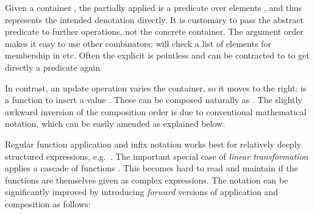 \begin{isabellebody}
\begin{isamarkuptext}
  Given a container , the partially applied  is a predicate over elements , and
  thus represents the intended denotation directly.  It is customary
  to pass the abstract predicate to further operations, not the
  concrete container.  The argument order makes it easy to use other
  combinators:  will check a list of
  elements for membership in  etc. Often the explicit
   is pointless and can be contracted to  to get directly a predicate again.

  In contrast, an update operation varies the container, so it moves
  to the right:  is a function  to
  insert a value .  These can be composed naturally as
  .  The slightly awkward
  inversion of the composition order is due to conventional
  mathematical notation, which can be easily amended as explained
  below.%
\end{isamarkuptext}%
\isamarkuptrue%
%
\isamarkuptrue%
%
\begin{isamarkuptext}%
Regular function application and infix notation works best for
  relatively deeply structured expressions, e.g.\ .  The important special case of \emph{linear transformation}
  applies a cascade of functions .  This
  becomes hard to read and maintain if the functions are themselves
  given as complex expressions.  The notation can be significantly
  improved by introducing \emph{forward} versions of application and
  composition as follows:


\end{isamarkuptext}
\end{isabellebody}
